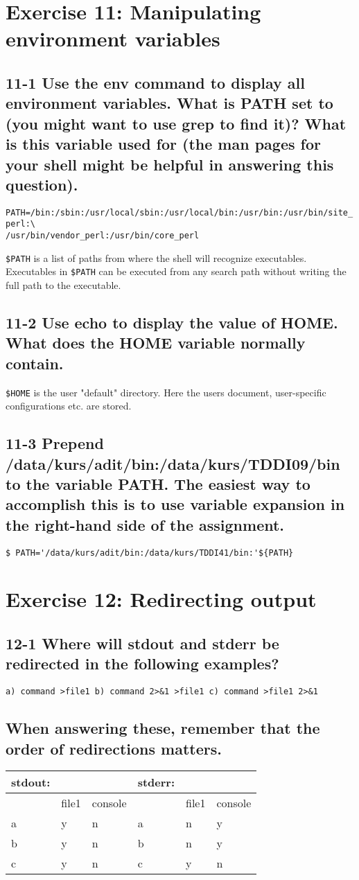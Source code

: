 \section{Exercise 11: Manipulating environment variables}
\subsection{11-1 Use the env command to display all environment variables. What is PATH set to (you might want to use grep to find it)? What is this variable used for (the man pages for your shell might be helpful in answering this question).}
\verb+PATH=/bin:/sbin:/usr/local/sbin:/usr/local/bin:/usr/bin:/usr/bin/site_perl:\+\\
\verb+/usr/bin/vendor_perl:/usr/bin/core_perl+

\verb=$PATH= is a list of paths from where the shell will recognize executables. Executables in \verb=$PATH= can be executed from any search path without writing the full path to the executable.

\subsection{11-2 Use echo to display the value of HOME. What does the HOME variable normally contain.}
\verb=$HOME= is the user "default" directory. Here the users document, user-specific configurations etc. are stored.

\subsection{11-3 Prepend /data/kurs/adit/bin:/data/kurs/TDDI09/bin to the variable PATH. The easiest way to accomplish this is to use variable expansion in the right-hand side of the assignment.}
\begin{verbatim}$ PATH='/data/kurs/adit/bin:/data/kurs/TDDI41/bin:'${PATH}\end{verbatim}

\section{Exercise 12: Redirecting output}
\subsection{12-1 Where will stdout and stderr be redirected in the following examples?}
\verb=a) command >file1 b) command 2>&1 >file1 c) command >file1 2>&1=
\subsection{When answering these, remember that the order of redirections matters.}
\begin{tabular}{l|ll||l|ll}
stdout: &&&	stderr:&&\\\hline
 &  file1 &console&	  & file1& console\\\hline
a&  y&	 n &	  a&  n&     y\\
b&  y&   n &		b&  n&     y\\
c&  y&	 n &		c&  y&	   n
\end{tabular}

